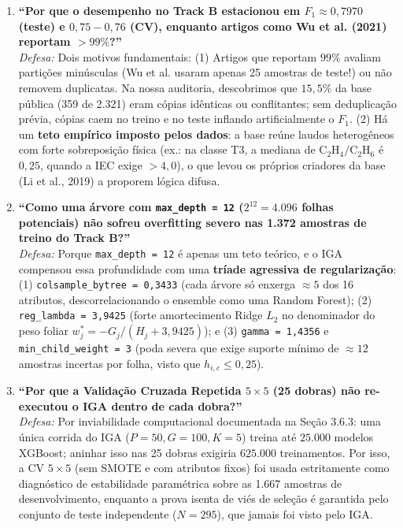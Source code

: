 \documentclass[10pt,a4paper]{article}
\begin{document}
\begin{defensecard}
\begin{enumerate}[leftmargin=0.5cm, itemsep=3pt]
  \item \textbf{``Por que o desempenho no Track B estacionou em $F_1 \approx 0{,}7970$ (teste) e $0{,}75-0{,}76$ (CV), enquanto artigos como Wu et al. (2021) reportam $> 99\%$?''}\\
  \textit{Defesa:} Dois motivos fundamentais: (1) Artigos que reportam $99\%$ avaliam partições minúsculas (Wu et al. usaram apenas 25 amostras de teste!) ou não removem duplicatas. Na nossa auditoria, descobrimos que $15{,}5\%$ da base pública (359 de 2.321) eram cópias idênticas ou conflitantes; sem deduplicação prévia, cópias caem no treino e no teste inflando artificialmente o $F_1$. (2) Há um \textbf{teto empírico imposto pelos dados}: a base reúne laudos heterogêneos com forte sobreposição física (ex.: na classe T3, a mediana de $\text{C}_2\text{H}_4/\text{C}_2\text{H}_6$ é $0{,}25$, quando a IEC exige $> 4{,}0$), o que levou os próprios criadores da base (Li et al., 2019) a proporem lógica difusa.

  \item \textbf{``Como uma árvore com \texttt{max\_depth = 12} ($2^{12} = 4.096$ folhas potenciais) não sofreu overfitting severo nas 1.372 amostras de treino do Track B?''}\\
  \textit{Defesa:} Porque \texttt{max\_depth = 12} é apenas um teto teórico, e o IGA compensou essa profundidade com uma \textbf{tríade agressiva de regularização}: (1) \texttt{colsample\_bytree = 0,3433} (cada árvore só enxerga $\approx 5$ dos 16 atributos, descorrelacionando o ensemble como uma Random Forest); (2) \texttt{reg\_lambda = 3,9425} (forte amortecimento Ridge $L_2$ no denominador do peso foliar $w_j^* = -G_j / (H_j + 3{,}9425)$); e (3) \texttt{gamma = 1,4356} e \texttt{min\_child\_weight = 3} (poda severa que exige suporte mínimo de $\approx 12$ amostras incertas por folha, visto que $h_{i,c} \le 0{,}25$).

  \item \textbf{``Por que a Validação Cruzada Repetida $5 \times 5$ (25 dobras) não re-executou o IGA dentro de cada dobra?''}\\
  \textit{Defesa:} Por inviabilidade computacional documentada na Seção 3.6.3: uma única corrida do IGA ($P=50, G=100, K=5$) treina até $25.000$ modelos XGBoost; aninhar isso nas 25 dobras exigiria $625.000$ treinamentos. Por isso, a CV $5\times 5$ (sem SMOTE e com atributos fixos) foi usada estritamente como diagnóstico de estabilidade paramétrica sobre as 1.667 amostras de desenvolvimento, enquanto a prova isenta de viés de seleção é garantida pelo conjunto de teste independente ($N=295$), que jamais foi visto pelo IGA.


\end{enumerate}
\end{defensecard}
\end{document}
